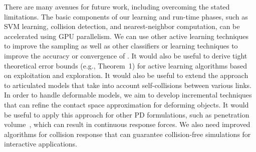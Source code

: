 There are many avenues for future work, including overcoming the stated limitations. The basic components of our learning and run-time phases, such as SVM learning, collision detection, and nearest-neighbor computation, can be accelerated using GPU parallelism. We can use other active learning techniques to improve the sampling as well as other classifiers or learning techniques to improve the accuracy or convergence of \LCS. It would also be useful to derive tight theoretical error bounds (e.g., Theorem~1) for active learning algorithms based on exploitation and exploration.
It would also be useful to extend the approach to articulated models that take into account self-collisions between various links.
In order to handle deformable models, we aim to develop incremental techniques that can refine the contact
space approximation for deforming objects. It would be useful to apply this approach for other PD formulations, such as penetration volume~\cite{Weller-RSS-09}, which can result in continuous response forces. We also need improved algorithms for collision response that can guarantee collision-free simulations for interactive applications.















